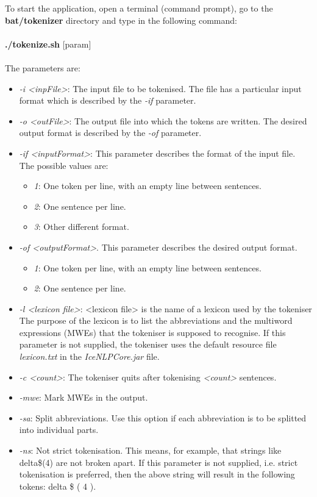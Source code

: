 \documentclass[11pt]{article}
\begin{document}
To start the application, open a terminal (command prompt), go to the \textbf{bat/tokenizer} directory and type in the following command:\\ \\
{\bf ./tokenize.sh} [param] \\ \\
The parameters are:
\begin{itemize}
\item \emph{-i <inpFile>}: The input file to be tokenised. The file has a particular input format which is described by the \emph{-if} parameter.
\item \emph{-o <outFile>}: The output file into which the tokens are written. The desired output format is described by the \emph{-of} parameter.
\item \emph{-if <inputFormat>}: This parameter describes the format of the input file.
The possible values are:
\begin{itemize}
\item \emph{1}: One token per line, with an empty line between sentences.
\item \emph{2}: One sentence per line.
\item \emph{3}: Other different format.
\end{itemize}
\item \emph{-of <outputFormat>}. This parameter describes the desired output format.
\begin{itemize}
\item \emph{1}: One token per line, with an empty line between sentences.
\item \emph{2}: One sentence per line.
\end{itemize}
\item \emph{-l <lexicon file>}: <lexicon file> is the name of a lexicon used by the tokeniser 
The purpose of the lexicon is to list the abbreviations and the multiword expressions (MWEs) that the tokeniser is supposed to recognise.
If this parameter is not supplied, the tokeniser uses the default resource file \emph{lexicon.txt} in the \emph{IceNLPCore.jar} file.
\item \emph{-c <count>}: The tokeniser quits after tokenising \emph{<count>} sentences.
\item \emph{-mwe}: Mark MWEs in the output. 
\item \emph{-sa}: Split abbreviations. Use this option if each abbreviation is to be splitted into individual parts.
\item \emph{-ns}: Not strict tokenisation. This means, for example, that strings like delta\$(4) are not broken apart. If this parameter is not supplied, i.e. strict tokenisation is preferred, then the above string will result in the following tokens: delta \$ ( 4 ).
\end{itemize}
\end{document}
